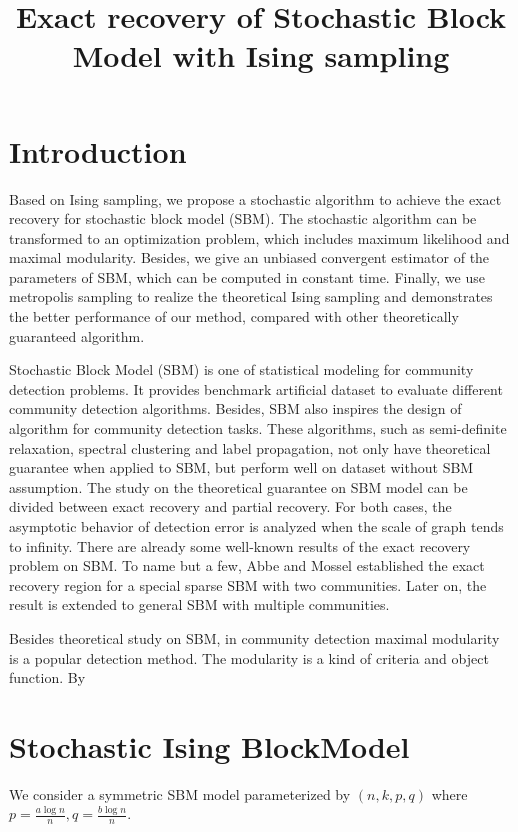 \documentclass{ctexart}
\title{Exact recovery of Stochastic Block Model with Ising sampling}
\begin{document}
	\maketitle
	\section{Introduction}
	Based on Ising sampling, we propose a stochastic algorithm to achieve the exact recovery for stochastic block model (SBM).
	The stochastic algorithm can be transformed to an optimization problem, which includes maximum likelihood and maximal modularity.
	Besides, we give an unbiased convergent estimator of the parameters of SBM, which can be computed in constant time.
	Finally, we use metropolis sampling to realize the theoretical Ising sampling and demonstrates the better performance of our method,
	compared with other theoretically guaranteed algorithm.
	
	Stochastic Block Model (SBM) is one of statistical modeling for community detection problems.
	It provides benchmark artificial dataset to evaluate different community detection algorithms.
	Besides, SBM also inspires the design of algorithm for community detection tasks. These algorithms, such as
	semi-definite relaxation, spectral clustering and label propagation, not only have theoretical guarantee when applied to SBM,
	but perform well on dataset without SBM assumption. The study on the theoretical guarantee on SBM model can be divided between
	exact recovery and partial recovery. For both cases, the asymptotic behavior of detection error
	is analyzed when the scale of graph tends to infinity. There are already some well-known results of the exact recovery problem
	on SBM.	To name but a few, Abbe and Mossel established the exact recovery region for a special sparse SBM with two communities.
	Later on, the result is extended to general SBM with multiple communities.
	
	Besides theoretical study on SBM, in community detection maximal modularity is a popular detection method. The modularity is
	a kind of criteria and object function. By 
	\section{Stochastic Ising BlockModel}\label{sec:sibm}
	We consider a symmetric SBM model parameterized by $(n, k, p, q)$ where $p=\frac{a\log n}{n}, q=\frac{b\log n }{n}$.
	
\end{document}
